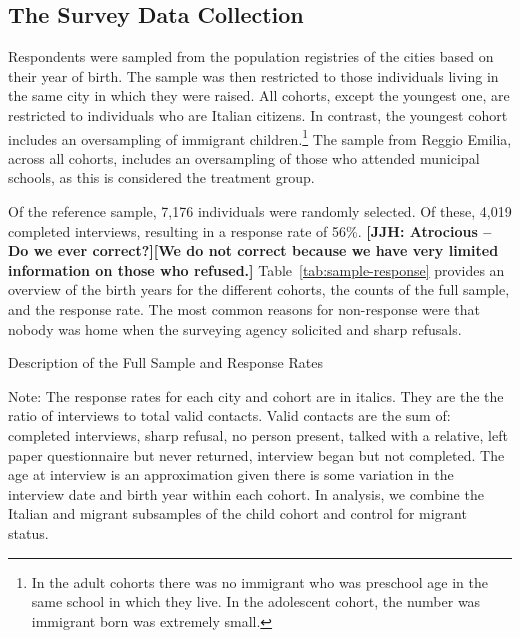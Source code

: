 \subsection{The Survey Data Collection}

Respondents were sampled from the population registries of the cities based on their year of birth. The sample was then restricted to those individuals living in the same city in which they were raised. All cohorts, except the youngest one, are restricted to individuals who are Italian citizens. In contrast, the youngest cohort includes an oversampling of immigrant children.\footnote{In the adult cohorts there was no immigrant who was preschool age in the same school in which they live. In the adolescent cohort, the number was immigrant born was extremely small.} The sample from Reggio Emilia, across all cohorts, includes an oversampling of those who attended municipal schools, as this is considered the treatment group.

Of the reference sample, 7,176 individuals were randomly selected. Of these, 4,019 completed interviews, resulting in a response rate of 56\%. \textbf{[JJH: Atrocious -- Do we ever correct?][We do not correct because we have very limited information on those who refused.]} Table~\ref{tab:sample-response} provides an overview of the birth years for the different cohorts, the counts of the full sample, and the response rate. The most common reasons for non-response were that nobody was home when the surveying agency solicited and sharp refusals. 

\begin{table}[H]
\centering
\begin{threeparttable}
	\caption{Description of the Full Sample and Response Rates}\label{tab:sample-response}
	
\begin{tablenotes}
\footnotesize
Note: The response rates for each city and cohort are in italics. They are the the ratio of interviews to total valid contacts. Valid contacts are the sum of: completed interviews, sharp refusal, no person present, talked with a relative, left paper questionnaire but never returned, interview began but not completed. The age at interview is an approximation given there is some variation in the interview date and birth year within each cohort. In analysis, we combine the Italian and migrant subsamples of the child cohort and control for migrant status.
\end{tablenotes}
\end{threeparttable}
\end{table}

